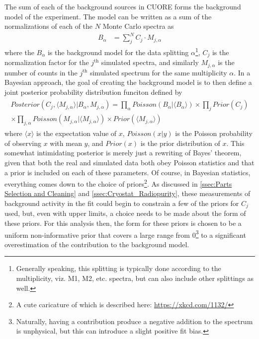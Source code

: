 The sum of each of the background sources in CUORE forms the background model of the experiment.
The model can be written as a sum of the normalizations of each of the $N$ Monte Carlo spectra as
\begin{align}
    B_\alpha &= \sum_j^N C_{j} \cdot M_{j,\alpha} 
\end{align}
where the $B_{\alpha}$ is the background model for the data splitting $\alpha$\footnote{Generally speaking, this splitting is typically done according to the multiplicity, viz. M1, M2, etc. spectra, but can also include other splittings as well.}, $C_{j}$ is the normalization factor for the $j^{\textrm{th}}$ simulated spectra, and similarly $M_{j,\alpha}$ is the number of counts in the $j^{\textrm{th}}$ simulated spectrum for the same multiplicity $\alpha$.
In a Bayesian approach, the goal of creating the background model is to then define a joint posterior probability distribution funciton defined by
\begin{align}
\begin{split}
        Posterior(C_j, \langle M_{j,\alpha}\rangle|B_\alpha, M_{j,\alpha}) = \prod_\alpha Poisson(B_\alpha|\langle B_\alpha\rangle)\times \prod_j Prior(C_j) \\ \times \prod_{j, \alpha}Poisson(M_{j,\alpha}|\langle M_{j,\alpha}\rangle) \times Prior(\langle M_{j,\alpha}\rangle)
\end{split}
\end{align}
where $\langle x \rangle$ is the expectation value of $x$, $Poisson(x|y)$ is the Poisson probability of observing $x$ with mean $y$, and $Prior(x)$ is the prior distribution of $x$.
This somewhat intimidating posterior is merely just a rewriting of Bayes' theorem, given that both the real and simulated data both obey Poisson statistics and that a prior is included on each of these parameters.
Of course, in Bayesian statistics, everything comes down to the choice of priors\footnote{\RaggedRight A cute caricature of which is described here: \url{https://xkcd.com/1132/}}.
As discussed in \autoref{ssec:Parts Selection and Cleaning} and \autoref{ssec:Cryostat_Radiopurity}, these measurements of background activity in the fit could begin to constrain a few of the priors for $C_j$ used, but, even with upper limits, a choice needs to be made about the form of these priors.
For this analysis then, the form for these priors is chosen to be a uniform non-informative prior that covers a large range from 0\footnote{Naturally, having a contribution produce a negative addition to the spectrum is unphysical, but this can introduce a slight positive fit bias.} to a significant overestimation of the contribution to the background model.
